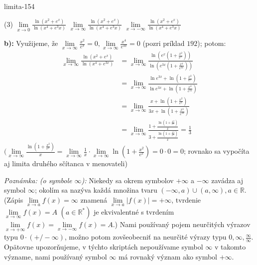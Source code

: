 \begin{defproblem}{limita-154}
\begin{tasks}(3)
    \task $\lim\limits_{{x \rightarrow 0}} \frac{\ln(x^2+e^x)}{\ln(x^4+e^3x)}$
    \task $\lim\limits_{{x \rightarrow \infty}} \frac{\ln(x^2+e^x)}{\ln(x^4+e^3x)}$
    \task $\lim\limits_{{x \rightarrow -\infty}} \frac{\ln(x^2+e^x)}{\ln(x^4+e^3x)}$
\end{tasks}


\begin{solution}
    \textbf{b):}
    Využijeme, že $\lim\limits_{x \rightarrow \infty} \frac{x^2}{e^x}=0,\lim\limits_{x
    \rightarrow \infty}\frac{x^4}{e^{3x}}=0$ (pozri príklad $192$); potom:
    \begin{align*}
        \lim\limits_{x \rightarrow \infty} \frac{\ln(x^2+e^x)}{\ln(x^4+e^{3x})}
        &= \lim\limits_{x \rightarrow \infty} \frac{\ln(e^x(1+\frac{x^2}{e^x}))}{\ln(e^{3x}(1+\frac{x^4}{e^{3x}}))} \\
        &= \lim\limits_{x \rightarrow \infty}\frac{\ln e^{3x}+\ln(1+\frac{x^2}{e^x})}{\ln e^{3x}+\ln(1+\frac{x^4}{e^{3x}})} \\
        &= \lim\limits_{x \rightarrow \infty}\frac{x+\ln(1+\frac{x^2}{e^x})}{3x+\ln(1+\frac{x^4}{e^{3x}})} \\
        &= \lim\limits_{x \rightarrow \infty}\frac{1+\frac{\ln(1+\frac{x^2}{e^x})}{x}}{3+\frac{\ln(1+\frac{x^4}{e^x})}{x}}
        = \frac{1}{3}
    \end{align*}
    $(\lim\limits_{x \rightarrow \infty}\frac{\ln(1+\frac{x^2}{e^x})}{x}=\lim\limits_{x
    \rightarrow \infty}\frac{1}{x} \cdot \lim\limits_{x \rightarrow
    \infty}\ln(1+\frac{x^2}{e^x})=0 \cdot 0=0$; rovnako sa vypočíta aj limita
    druhého sčítanca v menovateli)

    \textit{Poznámka: (o symbole $\infty$):}
    Niekedy sa okrem symbolov $+\infty$ a $-\infty$ zavádza aj symbol $\infty$;
    okolím sa nazýva každá množina tvaru $(-\infty,a)\cup (a,\infty), a \in
    \mathbb{R}$. (Zápis $\lim\limits_{x \rightarrow a}f(x)=\infty$ znamená
    $\lim\limits_{x \rightarrow a}|f(x)|=+\infty$, tvrdenie $\lim\limits_{x
    \rightarrow \infty} f(x)=A$ $(a \in \mathbb{R^*})$ je ekvivalentné s
    tvrdením $\lim\limits_{x \rightarrow +\infty}f(x)=\lim\limits_{x \rightarrow
    -\infty}f(x)=A$.) Nami používaný pojem neurčitých výrazov typu $0 \cdot (+/-
    \infty)$, možno potom zovšeobecniť na neurčité výrazy typu $0, \infty,
    \frac{\infty}{\infty}$. Opätovne upozorňujeme, v týchto skriptách
    nepoužívame symbol $\infty$ v takomto význame, nami používaný symbol
    $\infty$ má rovnaký význam ako symbol $+\infty$.
\end{solution}
\end{defproblem}

